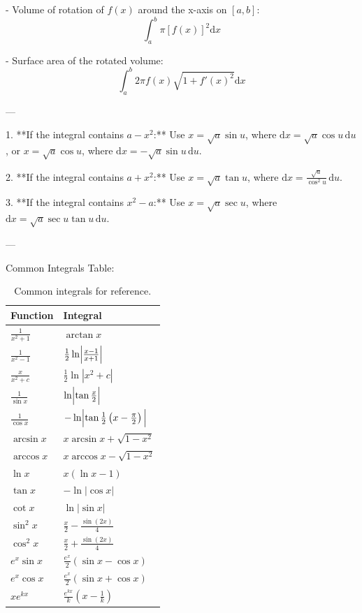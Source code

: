 \documentclass{article}
\begin{document}
- Volume of rotation of \(f(x)\) around the x-axis on \([a,b]\):
\[
\int_{a}^{b} \pi [f(x)]^2 \mathrm{d}x
\]

- Surface area of the rotated volume:
\[
\int_{a}^{b} 2\pi f(x) \sqrt{1 + f'(x)^2} \mathrm{d}x
\]

---

1. **If the integral contains \(a-x^2\):**
   Use \(x = \sqrt{a}\sin u\), where \(\mathrm{d}x = \sqrt{a}\cos u \, \mathrm{d}u\),  
   or \(x = \sqrt{a}\cos u\), where \(\mathrm{d}x = -\sqrt{a}\sin u \, \mathrm{d}u\).

2. **If the integral contains \(a+x^2\):**
   Use \(x = \sqrt{a}\tan u\), where \(\mathrm{d}x = \frac{\sqrt{a}}{\cos^2 u} \, \mathrm{d}u\).

3. **If the integral contains \(x^2 - a\):**
   Use \(x = \sqrt{a}\sec u\), where \(\mathrm{d}x = \sqrt{a}\sec u \tan u \, \mathrm{d}u\).

---

Common Integrals Table:

\begin{table}[!h]
\renewcommand{\arraystretch}{1.5}
\centering
\begin{tabular}{|p{}|p{}|}
\hline
\textbf{Function} & \textbf{Integral} \\
\hline
\(\frac{1}{x^2+1}\) & \(\arctan x\) \\
\hline
\(\frac{1}{x^2-1}\) & \(\frac{1}{2} \ln\Bigl|\frac{x-1}{x+1}\Bigl|\) \\
\hline
\(\frac{x}{x^2+c}\) & \(\frac{1}{2} \ln|x^2+c|\) \\
\hline
\(\frac{1}{\sin x}\) & \(\ln\Bigl|\tan\frac{x}{2}\Bigl|\) \\
\hline
\(\frac{1}{\cos x}\) & \(-\ln\Bigl|\tan\frac{1}{2}\left(x-\frac{\pi}{2}\right)\Bigl|\) \\
\hline
\(\arcsin x\) & \(x \arcsin x + \sqrt{1-x^2}\) \\
\hline
\(\arccos x\) & \(x \arccos x - \sqrt{1-x^2}\) \\
\hline
\(\ln x\) & \(x(\ln x - 1)\) \\
\hline
\(\tan x\) & \(-\ln|\cos x|\) \\
\hline
\(\cot x\) & \(\ln|\sin x|\) \\
\hline
\(\sin^2 x\) & \(\frac{x}{2} - \frac{\sin(2x)}{4}\) \\
\hline
\(\cos^2 x\) & \(\frac{x}{2} + \frac{\sin(2x)}{4}\) \\
\hline
\(e^x \sin x\) & \(\frac{e^x}{2} (\sin x - \cos x)\) \\
\hline
\(e^x \cos x\) & \(\frac{e^x}{2} (\sin x + \cos x)\) \\
\hline
\(x e^{kx}\) & \(\frac{e^{kx}}{k} \left(x - \frac{1}{k}\right)\) \\
\hline
\end{tabular}
\caption{Common integrals for reference.}
\end{table}
\end{document}
